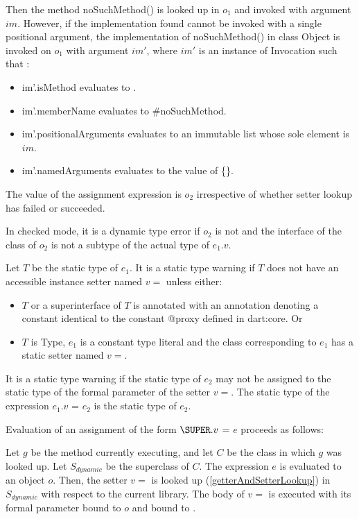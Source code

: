 \documentclass{article}
\newcommand{\code}[1]{{\sf #1}}
\begin{document}
\LMHash{}
Then the method \code{noSuchMethod()} is looked up in $o_1$ and invoked  with argument $im$. 
However, if the implementation found cannot be invoked with a single positional argument, the implementation  of \code{noSuchMethod()} in class \code{Object} is invoked on $o_1$ with argument $im'$, where $im'$ is an instance of \code{Invocation} such that :
\begin{itemize}
\item  \code{im'.isMethod} evaluates to \code{\TRUE{}}.
\item  \code{im'.memberName} evaluates to \code{\#noSuchMethod}.
\item \code{im'.positionalArguments} evaluates to an immutable list whose sole element is  $im$.
\item \code{im'.namedArguments} evaluates to the value of \code{\CONST{} \{\}}.
\end{itemize}

\LMHash{}
The value of the assignment expression is $o_2$ irrespective of whether setter lookup has failed or succeeded.

\LMHash{}
In checked mode, it is a dynamic type error if $o_2$ is not \NULL{} and the interface of the class of $o_2$ is not a subtype of the actual type of $e_1.v$.

\LMHash{}
Let $T$ be the static type of $e_1$. It is a static type warning if $T$ does not have an accessible instance setter named $v=$ unless either:
\begin{itemize}
\item $T$ or a superinterface of $T$ is annotated with an annotation denoting a constant identical to the constant \code{@proxy} defined in \code{dart:core}. Or
\item $T$ is \code{Type}, $e_1$ is a constant type literal and the class corresponding to $e_1$ has a static setter named $v=$. 
\end{itemize}



\LMHash{}
It is a static type warning if the static type of $e_2$ may not be assigned to the static type of the formal parameter of the setter $v=$.   The static type of the expression $e_1.v$ \code{=} $e_2$ is the static type of $e_2$.

\LMHash{}
Evaluation of an assignment of the form $\SUPER.v$ \code{=} $e$ proceeds as follows:

\LMHash{}
Let $g$ be the method currently executing, and let $C$ be the class in which $g$ was looked up.  Let $S_{dynamic}$ be the superclass of $C$. 
The expression $e$ is evaluated to an object $o$.  Then, the setter $v=$ is looked up (\ref{getterAndSetterLookup}) in $S_{dynamic}$ with respect to the current library.  The body  of $v=$ is executed with its formal parameter bound to $o$ and \THIS{} bound to \THIS{}. 
\end{document}
